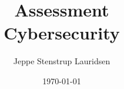\documentclass[12pt]{article}
\title{%
Assessment \\
\large Cybersecurity}
\author{Jeppe Stenstrup Lauridsen}
\date{\today}
\begin{document}
\begin{titlepage}
\clearpage\maketitle
\thispagestyle{empty}
\end{titlepage}








\end{document}
